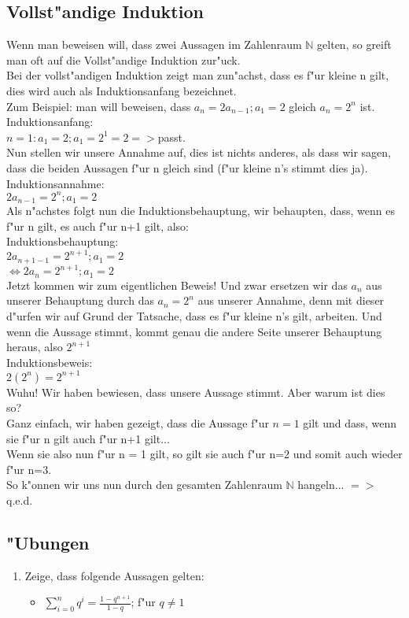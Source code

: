 \subsection{Vollst"andige Induktion}
Wenn man beweisen will, dass zwei Aussagen im Zahlenraum $\mathbb{N}$ gelten, so greift man oft auf die Vollst"andige Induktion zur"uck.\\
Bei der vollst"andigen Induktion zeigt man zun"achst, dass es f"ur kleine n gilt, dies wird auch als Induktionsanfang bezeichnet.\\
Zum Beispiel: man will beweisen, dass $a_{n}=2a_{n-1}; a_1 = 2$ gleich $a_n = 2^n$ ist.\\
Induktionsanfang:\\
$n=1: a_1 = 2; a_1 = 2^1 = 2 =>$passt.\\
Nun stellen wir unsere Annahme auf, dies ist nichts anderes, als dass wir sagen, dass die beiden Aussagen f"ur n gleich sind (f"ur kleine n's stimmt dies ja).\\
Induktionsannahme:\\
$2a_{n-1}=2^n; a_1 = 2$\\
Als n"achstes folgt nun die Induktionsbehauptung, wir behaupten, dass, wenn es f"ur n gilt, es auch f"ur
n+1 gilt, also:\\
Induktionsbehauptung:\\
$2a_{n+1-1} = 2^{n+1}; a_1 = 2$\\
$\Leftrightarrow 2a_{n} = 2^{n+1}; a_1 = 2$\\
Jetzt kommen wir zum eigentlichen Beweis! Und zwar ersetzen wir das $a_{n}$ aus unserer Behauptung durch das $a_n = 2^n$ aus unserer Annahme, denn mit dieser d"urfen wir auf Grund der Tatsache, dass es f"ur kleine n's gilt, arbeiten. Und wenn die Aussage stimmt, kommt genau die andere Seite unserer Behauptung heraus, also $ 2^{n+1}$\\
Induktionsbeweis:\\
$2(2^n)= 2^{n+1}$\\
Wuhu! Wir haben bewiesen, dass unsere Aussage stimmt. Aber warum ist dies so?\\
Ganz einfach, wir haben gezeigt, dass die Aussage f"ur $n=1$ gilt und dass, wenn sie f"ur n gilt auch f"ur n+1 gilt...\\
Wenn sie also nun f"ur n = 1 gilt, so gilt sie auch f"ur n=2 und somit auch wieder f"ur n=3.\\
So k"onnen wir uns nun durch den gesamten Zahlenraum $\mathbb{N}$ hangeln... $=>$ q.e.d.

\subsection{"Ubungen}
\begin{enumerate}
\item Zeige, dass folgende Aussagen gelten:
\begin{itemize}
\item $\sum\limits_{i=0}^{n} q^i = \frac{1-q^{n+1}}{1-q}$; f"ur $q \neq 1$
\end{itemize}
\end{enumerate}